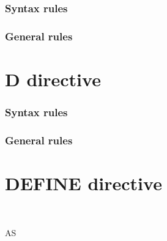 \subsubsection{Syntax rules}

\subsubsection{General rules}

\section{D directive}

\begin{syntax}[\miscextcolour]
  \directiveindicator{} \sourcetext
\end{syntax}

\subsubsection{Syntax rules}

\subsubsection{General rules}

\section{DEFINE directive}

\begin{syntax}
  \begin{1=}
    \directiveindicator \\
    \miscext{\textdollar}
  \end{1=}
   AS
  \begin{1=}
    \begin{1=}
      \literal \\
    \end{1=}
    \begin{0-1}
    \end{0-1} \\
  \end{1=}
\end{syntax}

